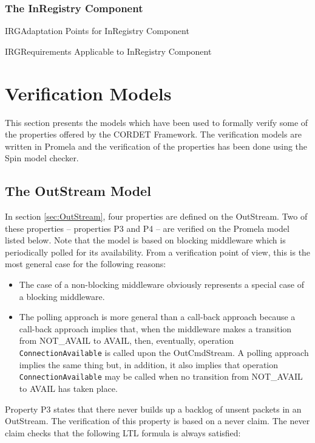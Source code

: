 \documentclass{pnp_article}
\begin{document}
\subsubsection{The InRegistry Component}\label{sec:InRegistry}


\begin{crAp}{IRG}{Adaptation Points for InRegistry Component}
\end{crAp}

\begin{crReq}{IRG}{Requirements Applicable to InRegistry Component}
\end{crReq}


\appendix
\section{Verification Models}\label{sec:VerModels}
This section presents the models which have been used to formally verify some of the properties offered by the CORDET Framework. The verification models are written in Promela and the verification of the properties has been done using the Spin model checker.

\subsection{The OutStream Model}\label{sec:OutStreamModel}

In section \ref{sec:OutStream}, four properties are defined on the OutStream. Two of these properties – properties P3 and P4 – are verified on the Promela model listed below. Note that the model is based on blocking middleware which is periodically polled for its availability. From a verification point of view, this is the most general case for the following reasons:
\begin{itemize}
\item The case of a non-blocking middleware obviously represents a special case of a blocking middleware.
\item The polling approach is more general than a call-back approach because a call-back approach implies that, when the middleware makes a transition from NOT\_AVAIL to AVAIL, then, eventually, operation \texttt{ConnectionAvailable} is called upon the OutCmdStream. A polling approach implies the same thing but, in addition, it also implies that operation \texttt{ConnectionAvailable} may be called when no transition from NOT\_AVAIL to AVAIL has taken place.
\end{itemize}
Property P3 states that there never builds up a backlog of unsent packets in an OutStream. The verification of this property is based on a never claim. The never claim checks that the following LTL formula is always satisfied:
\end{document}
